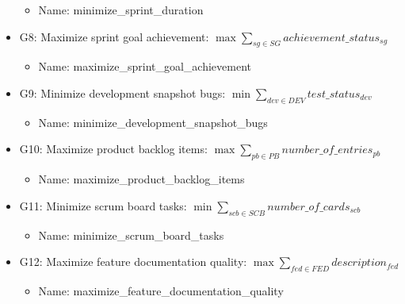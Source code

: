 \documentclass{article}
\begin{document}
\begin{itemize}
        \begin{itemize}
            \item Name: minimize\_sprint\_duration
        \end{itemize}
    \item G8: Maximize sprint goal achievement: $\max \sum_{sg \in SG} achievement\_status_{sg}$
        \begin{itemize}
            \item Name: maximize\_sprint\_goal\_achievement
        \end{itemize}
    \item G9: Minimize development snapshot bugs: $\min \sum_{dev \in DEV} test\_status_{dev}$
        \begin{itemize}
            \item Name: minimize\_development\_snapshot\_bugs
        \end{itemize}
    \item G10: Maximize product backlog items: $\max \sum_{pb \in PB} number\_of\_entries_{pb}$
        \begin{itemize}
            \item Name: maximize\_product\_backlog\_items
        \end{itemize}
    \item G11: Minimize scrum board tasks: $\min \sum_{scb \in SCB} number\_of\_cards_{scb}$
        \begin{itemize}
            \item Name: minimize\_scrum\_board\_tasks
        \end{itemize}
    \item G12: Maximize feature documentation quality: $\max \sum_{fed \in FED} description_{fed}$
        \begin{itemize}
            \item Name: maximize\_feature\_documentation\_quality
        \end{itemize}
\end{itemize}
\end{document}
